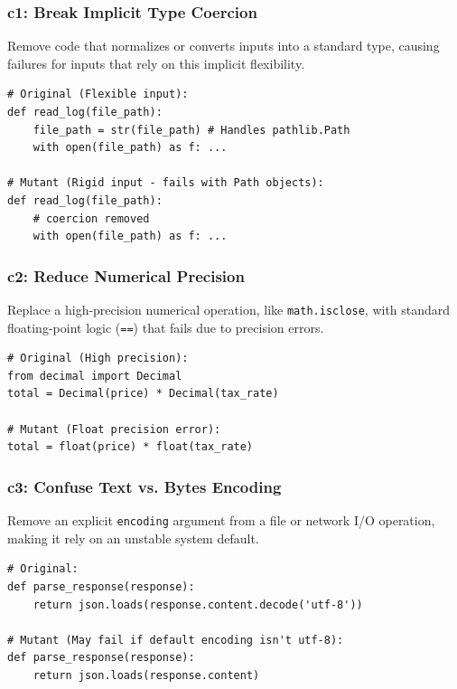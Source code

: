 \documentclass[11pt]{article}
\begin{document}
\subsubsection*{c1: Break Implicit Type Coercion}
Remove code that normalizes or converts inputs into a standard type, causing failures for inputs that rely on this implicit flexibility.

\begin{listing}[H]
\begin{verbatim}
# Original (Flexible input):
def read_log(file_path):
    file_path = str(file_path) # Handles pathlib.Path
    with open(file_path) as f: ...

# Mutant (Rigid input - fails with Path objects):
def read_log(file_path):
    # coercion removed
    with open(file_path) as f: ...
\end{verbatim}
\caption{c1: Removing type flexibility}
\label{code:c1}
\end{listing}

\subsubsection*{c2: Reduce Numerical Precision}
Replace a high-precision numerical operation, like \texttt{math.isclose}, with standard floating-point logic (\texttt{==}) that fails due to precision errors.

\begin{listing}[H]
\begin{verbatim}
# Original (High precision):
from decimal import Decimal
total = Decimal(price) * Decimal(tax_rate)

# Mutant (Float precision error):
total = float(price) * float(tax_rate)
\end{verbatim}
\caption{c2: Downgrading numerical precision}
\label{code:c2}
\end{listing}

\subsubsection*{c3: Confuse Text vs. Bytes Encoding}
Remove an explicit \texttt{encoding} argument from a file or network I/O operation, making it rely on an unstable system default.

\begin{listing}[H]
\begin{verbatim}
# Original:
def parse_response(response):
    return json.loads(response.content.decode('utf-8'))

# Mutant (May fail if default encoding isn't utf-8):
def parse_response(response):
    return json.loads(response.content) 
\end{verbatim}
\caption{c3: Ignoring explicit encoding requirements}
\label{code:c3}
\end{listing}
\end{document}

